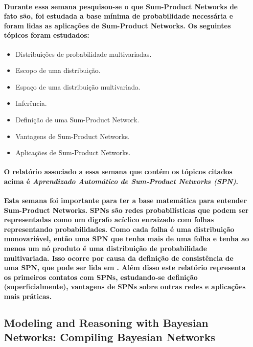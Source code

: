 \documentclass[a4paper,10pt]{article}
\theoremstyle{plain}
\begin{document}
\paragraph{
  Durante essa semana pesquisou-se o que Sum-Product Networks de fato são, foi estudada a base
  mínima de probabilidade necessária e foram lidas as aplicações de Sum-Product Networks. Os
  seguintes tópicos foram estudados:
}

\begin{itemize}
  \item Distribuições de probabilidade multivariadas.
  \item Escopo de uma distribuição.
  \item Espaço de uma distribuição multivariada.
  \item Inferência.
  \item Definição de uma Sum-Product Network.
  \item Vantagens de Sum-Product Networks.
  \item Aplicações de Sum-Product Networks.
\end{itemize}

\paragraph{
  O relatório associado a essa semana que contém os tópicos citados acima é \textit{Aprendizado
  Automático de Sum-Product Networks (SPN)}\cite{project-def}.
}

\paragraph{
  Esta semana foi importante para ter a base matemática para entender Sum-Product Networks. SPNs
  são redes probabilísticas que podem ser representadas como um digrafo acíclico enraizado com
  folhas representando probabilidades. Como cada folha é uma distribuição monovariável, então uma
  SPN que tenha mais de uma folha e tenha ao menos um nó produto é uma distribuição de
  probabilidade multivariada. Isso ocorre por causa da definição de consistência de uma SPN, que
  pode ser lida em \cite{report-9}. Além disso este relatório representa os primeiros contatos com
  SPNs, estudando-se definição (superficialmente), vantagens de SPNs sobre outras redes e
  aplicações mais práticas.
}

\subsection{Modeling and Reasoning with Bayesian Networks: Compiling Bayesian Networks}
\end{document}
